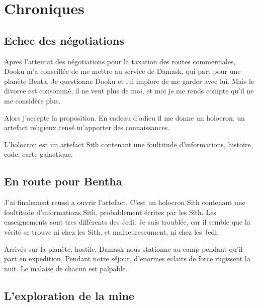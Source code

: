 \documentclass[10pt,a4paper,twoside,twocolumn,openany]{book}
\begin{document}
\color{black}

\chapter{Chroniques}


\section{Echec des négotiations}

Apres l'attentat des négotiations pour la taxation des routes commerciales, Dooku m'a conseillée de me mettre au service de Damask, qui part pour une planète Benta. Je questionne Dooku et lui implore de me garder avec lui. Mais le divorce est consommé, il ne veut plus de moi, et moi je me rends compte qu'il ne me considère plus.

Alors j'accepte la proposition. En cadeau d'adieu il me donne un holocron. un artefact religieux censé m'apporter des connaissances.

\begin{quotebox}
L'holocron est un artefact Sith contenant une foultitude d'informations, histoire, code, 
carte galactique.
\end{quotebox}

\section{En route pour Bentha} 

J'ai finalement reussi a ouvrir l'artefact. C'est un holocron Sith contenant une foultitude d'informations Sith, probablement écrites par les Sith. Les enseignements sont tres différents des Jedi.
Je suis troublée, car il semble que la vérité se trouve ni chez les Sith, et malheureseument, ni chez les Jedi.

Arrivés sur la planète, hostile, Damask nous stationne au camp pendant qu'il part en expedition. Pendant notre séjour, d'enormes eclairs de force rugissent la nuit. Le malaise de chacun est palpable.

\section{L'exploration de la mine}
\end{document}
